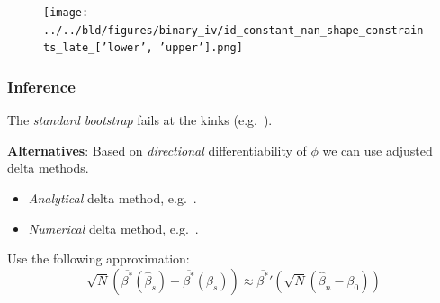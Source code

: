 \documentclass[11pt, aspectratio=169]{beamer}
\begin{document}
\begin{frame}
    \begin{figure}
        \texttt{[image: ../../bld/figures/binary\_iv/id\_constant\_nan\_shape\_constraints\_late\_['lower', 'upper'].png]}
    \end{figure}
\end{frame}

\begin{frame}
    \frametitle{Inference}

    The \textit{standard bootstrap} fails at the kinks (e.g.~\citet{fang2019infdirdiff}).

    \vspace{0.5cm}

    \textbf{Alternatives}: Based on \textit{directional} differentiability of $\phi$ we can use adjusted delta methods.
    \begin{itemize}
        \item \textit{Analytical} delta method, e.g.~\cite{fang2019infdirdiff}.
        \item \textit{Numerical} delta method, e.g.~\cite{hong2018numerical}.
    \end{itemize}

    \vspace{0.5cm}
    Use the following approximation:
    \begin{equation*}
        \sqrt{N}\left({\overline{\beta^*}(\hat{\beta}_s)} - \overline{\beta^*}(\beta_s)\right) \approx \overline{\beta^*}'\left(\sqrt{N}\left(\hat{\beta}_n - \beta_0\right)\right)
    \end{equation*}


\end{frame}

\end{document}
